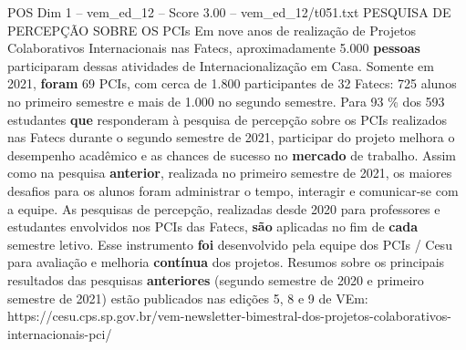 \begin{textsample}{POS Dim 1 – vem\_ed\_12 – Score 3.00 – vem\_ed\_12/t051.txt}  \label{ex:f1_pos_188}
PESQUISA DE PERCEPÇÃO SOBRE OS PCIs Em nove anos de realização de Projetos Colaborativos Internacionais nas Fatecs, aproximadamente 5.000 \textbf{pessoas} participaram dessas atividades de Internacionalização em Casa.
Somente em 2021, \textbf{foram} 69 PCIs, com cerca de 1.800 participantes de 32 Fatecs: 725 alunos no primeiro semestre e mais de 1.000 no segundo semestre.
Para 93 \% dos 593 estudantes \textbf{que} responderam à pesquisa de percepção sobre os PCIs realizados nas Fatecs durante o segundo semestre de 2021, participar do projeto melhora o desempenho acadêmico e as chances de sucesso no \textbf{mercado} de trabalho.
Assim como na pesquisa \textbf{anterior}, realizada no primeiro semestre de 2021, os maiores desafios para os alunos foram administrar o tempo, interagir e comunicar-se com a equipe.
As pesquisas de percepção, realizadas desde 2020 para professores e estudantes envolvidos nos PCIs das Fatecs, \textbf{são} aplicadas no fim de \textbf{cada} semestre letivo.
Esse instrumento \textbf{foi} desenvolvido pela equipe dos PCIs / Cesu para avaliação e melhoria \textbf{contínua} dos projetos.
Resumos sobre os principais resultados das pesquisas \textbf{anteriores} (segundo semestre de 2020 e primeiro semestre de 2021) estão publicados nas edições 5, 8 e 9 de VEm: https://cesu.cps.sp.gov.br/vem-newsletter-bimestral-dos-projetos-colaborativos-internacionais-pci/

\end{textsample}
